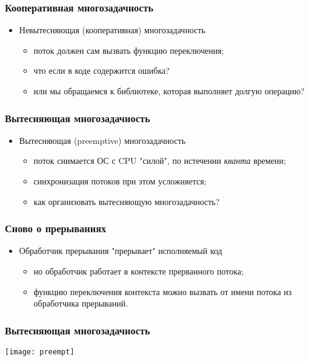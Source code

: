 \begin{frame}
\frametitle{Кооперативная многозадачность}
\begin{itemize}
   \item<1->Невытесняющая (кооперативная) многозадачность
   \begin{itemize}
      \item<1->поток должен сам вызвать функцию переключения;
      \item<2->что если в коде содержится ошибка?
      \item<3->или мы обращаемся к библиотеке, которая выполняет долгую операцию?
   \end{itemize}
\end{itemize}
\end{frame}

\begin{frame}
\frametitle{Вытесняющая многозадачность}
\begin{itemize}
    \item<1->Вытесняющая (preemptive) многозадачность
    \begin{itemize}
        \item<1->поток снимается ОС с CPU "силой", по истечении \emph{кванта}
             времени;
        \item<2->синхронизация потоков при этом усложняется;
        \item<3->как организовать вытесняющую многозадачность?
    \end{itemize}
\end{itemize}
\end{frame}

\begin{frame}
\frametitle{Сново о прерываниях}
\begin{itemize}
    \item<1->Обработчик прерывания "прерывает" исполняемый код
    \begin{itemize}
        \item<2->но обработчик работает в контексте прерванного потока;
        \item<3->функцию переключения контекста можно вызвать от имени потока
             из обработчика прерываний.
    \end{itemize}
\end{itemize}
\end{frame}

\begin{frame}
\frametitle{Вытесняющая многозадачность}
\texttt{[image: preempt]}
\end{frame}

